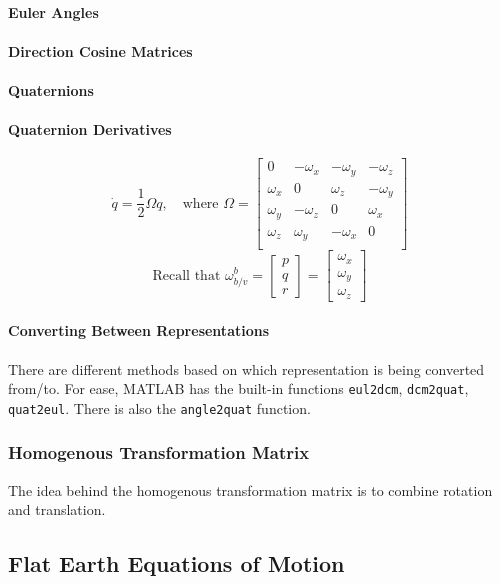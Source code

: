 \documentclass[../notes.tex]{subfiles}
\begin{document}
\paragraph{Euler Angles}
\paragraph{Direction Cosine Matrices}
\paragraph{Quaternions}
\paragraph{Quaternion Derivatives}
\begin{equation} \label{eq:quat_derivs}
    \dot{q} = \frac{1}{2}\Omega q, \quad \text{where } \Omega = \begin{bmatrix}
        0 &-\omega_x &-\omega_y &-\omega_z \\
        \omega_x &0 &\omega_z &-\omega_y \\
        \omega_y &-\omega_z &0 &\omega_x \\
        \omega_z &\omega_y &-\omega_x &0 \\
    \end{bmatrix}
\end{equation}
\begin{equation*}
    \text{Recall that } \omega^b_{b/v} = \begin{bmatrix}
        p \\ q \\ r
    \end{bmatrix} = \begin{bmatrix}
        \omega_x \\ \omega_y \\ \omega_z
    \end{bmatrix}
\end{equation*}

\paragraph{Converting Between Representations}
There are different methods based on which representation is being converted from/to. For ease, MATLAB has the built-in functions \verb|eul2dcm|, \verb|dcm2quat|, \verb|quat2eul|. There is also the \verb|angle2quat| function.

\subsubsection{Homogenous Transformation Matrix}
The idea behind the homogenous transformation matrix is to combine rotation and translation.

\subsection{Flat Earth Equations of Motion}
\end{document}
